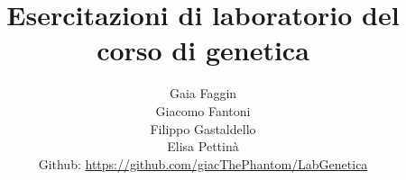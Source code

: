 

\title{\Huge \textbf{Esercitazioni di laboratorio del corso di genetica}}

\author{
  Gaia Faggin\\
  Giacomo Fantoni \\
  Filippo Gastaldello\\
  Elisa Pettin\`a\\
  \small Github: \href{https://github.com/giacThePhantom/LabGenetica}{https://github.com/giacThePhantom/LabGenetica}}

	
	\maketitle

	
	
	
	
	
	


